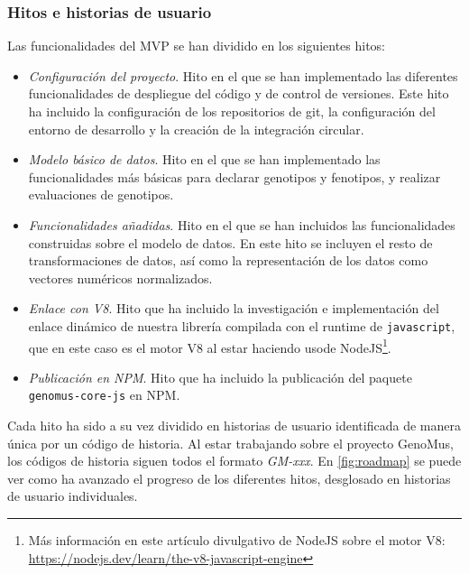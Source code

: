 \subsubsection{Hitos e historias de usuario}

Las funcionalidades del MVP se han dividido en los siguientes hitos: 

\begin{itemize}
    \item \textit{Configuración del proyecto}. Hito en el que se han implementado las diferentes funcionalidades de despliegue del código y de control de versiones. Este hito ha incluido la configuración de los repositorios de git, la configuración del entorno de desarrollo y la creación de la integración circular.

    \item \textit{Modelo básico de datos}. Hito en el que se han implementado las funcionalidades más básicas para declarar genotipos y fenotipos, y realizar evaluaciones de genotipos.
    
    \item \textit{Funcionalidades añadidas}. Hito en el que se han incluidos las funcionalidades construidas sobre el modelo de datos. En este hito se incluyen el resto de transformaciones de datos, así como la representación de los datos como vectores numéricos normalizados.
        
    \item \textit{Enlace con V8}. Hito que ha incluido la investigación e implementación del enlace dinámico de nuestra librería compilada con el runtime de \verb|javascript|, que en este caso es el motor V8 al estar haciendo usode NodeJS\footnote{Más información en este artículo divulgativo de NodeJS sobre el motor V8: \url{https://nodejs.dev/learn/the-v8-javascript-engine}}.
    
    \item \textit{Publicación en NPM}. Hito que ha incluido la publicación del paquete \verb|genomus-core-js| en NPM.
\end{itemize}

Cada hito ha sido a su vez dividido en historias de usuario identificada de manera única por un código de historia. Al estar trabajando sobre el proyecto GenoMus, los códigos de historia siguen todos el formato \textit{GM-xxx}. En \ref{fig:roadmap} se puede ver como ha avanzado el progreso de los diferentes hitos, desglosado en historias de usuario individuales.

